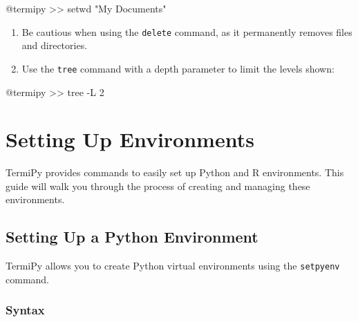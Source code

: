 \documentclass[
  letterpaper,
  DIV=11,
  numbers=noendperiod]{scrreprt}
\newenvironment{Shaded}{\begin{snugshade}}{\end{snugshade}}
\newcommand{\AttributeTok}[1]{\textcolor[rgb]{0.40,0.45,0.13}{#1}}
\newcommand{\ExtensionTok}[1]{\textcolor[rgb]{0.00,0.23,0.31}{#1}}
\newcommand{\NormalTok}[1]{\textcolor[rgb]{0.00,0.23,0.31}{#1}}
\newcommand{\OperatorTok}[1]{\textcolor[rgb]{0.37,0.37,0.37}{#1}}
\newcommand{\StringTok}[1]{\textcolor[rgb]{0.13,0.47,0.30}{#1}}
\providecommand{\tightlist}{%
  \setlength{\itemsep}{0pt}\setlength{\parskip}{0pt}}\usepackage{longtable,booktabs,array}
\begin{document}
\begin{Shaded}
\begin{Highlighting}[]
\ExtensionTok{@termipy} \OperatorTok{\textgreater{}\textgreater{}}\NormalTok{ setwd }\StringTok{"My Documents"}
\end{Highlighting}
\end{Shaded}

\begin{enumerate}
\def\labelenumi{\arabic{enumi}.}
\setcounter{enumi}{2}
\tightlist
\item
  Be cautious when using the \texttt{delete} command, as it permanently
  removes files and directories.
\item
  Use the \texttt{tree} command with a depth parameter to limit the
  levels shown:
\end{enumerate}

\begin{Shaded}
\begin{Highlighting}[]
\ExtensionTok{@termipy} \OperatorTok{\textgreater{}\textgreater{}}\NormalTok{ tree }\AttributeTok{{-}L}\NormalTok{ 2}
\end{Highlighting}
\end{Shaded}


\chapter*{Setting Up Environments}\label{setting-up-environments}


TermiPy provides commands to easily set up Python and R environments.
This guide will walk you through the process of creating and managing
these environments.

\section*{Setting Up a Python
Environment}\label{setting-up-a-python-environment}


TermiPy allows you to create Python virtual environments using the
\texttt{setpyenv} command.

\subsection*{Syntax}\label{syntax}
\end{document}
